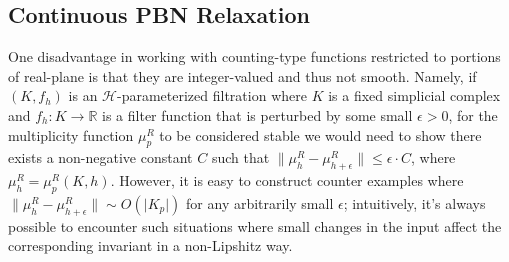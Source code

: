 \documentclass[10pt]{article}
\numberwithin{equation}{section}
\newcommand{\+}{%
	\raisebox{0.18ex}{\scaleobj{0.55}{+}}
}
\theoremstyle{definition}
\begin{document}
\subsection{Continuous PBN Relaxation}
%

One disadvantage in working with counting-type functions restricted to portions of real-plane is that they are integer-valued and thus not smooth. 
Namely, if $(K, f_h)$ is an $\mathcal{H}$-parameterized filtration where $K$ is a fixed simplicial complex and $f_h : K \to \mathbb{R}$ is a filter function that is perturbed by some small $\epsilon > 0$, for the multiplicity function $\mu_p^R$ to be considered stable we would need to show 
there exists a non-negative constant $C$ such that $\lVert \mu_h^R - \mu_{h + \epsilon}^R \rVert \leq \epsilon \cdot C$, where $\mu^R_{h} = \mu_p^R(K,h)$.
However, it is easy to construct counter examples where $\lVert \mu_h^R - \mu_{h + \epsilon}^R \rVert \sim O(\lvert K_p \rvert )$ for any arbitrarily small $\epsilon$;
intuitively, it's always possible to encounter such situations where small changes in the input affect the corresponding invariant in a non-Lipshitz way.
 
\end{document}
